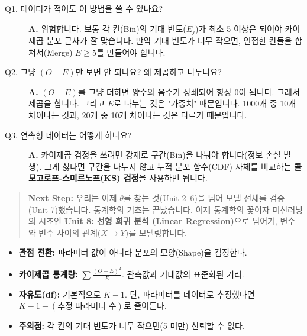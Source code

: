\documentclass[11pt,a4paper]{book}
\theoremstyle{definition}
\begin{document}
\begin{description}
    \item[Q1. 데이터가 적어도 이 방법을 쓸 수 있나요?]
    \textbf{A.} 위험합니다. 보통 각 칸(Bin)의 기대 빈도($E_j$)가 최소 5 이상은 되어야 카이제곱 분포 근사가 잘 맞습니다. 만약 기대 빈도가 너무 작으면, 인접한 칸들을 합쳐서(Merge) $E \ge 5$를 만들어야 합니다.
    
    \item[Q2. 그냥 $(O-E)$만 보면 안 되나요? 왜 제곱하고 나누나요?]
    \textbf{A.} $(O-E)$를 그냥 더하면 양수와 음수가 상쇄되어 항상 0이 됩니다. 그래서 제곱을 합니다. 그리고 $E$로 나누는 것은 "가중치" 때문입니다. 1000개 중 10개 차이나는 것과, 20개 중 10개 차이나는 것은 다르기 때문입니다.
    
    \item[Q3. 연속형 데이터는 어떻게 하나요?]
    \textbf{A.} 카이제곱 검정을 쓰려면 강제로 구간(Bin)을 나눠야 합니다(정보 손실 발생). 그게 싫다면 구간을 나누지 않고 누적 분포 함수(CDF) 자체를 비교하는 \textbf{콜모고로프-스미르노프(KS) 검정}을 사용하면 됩니다.
\end{description}

\vspace{1cm}
\begin{quote}
\textbf{Next Step:} 우리는 이제 $\theta$를 찾는 것(Unit 2~6)을 넘어 모델 전체를 검증(Unit 7)했습니다. 통계학의 기초는 끝났습니다. 이제 통계학의 꽃이자 머신러닝의 시초인 \textbf{Unit 8: 선형 회귀 분석 (Linear Regression)}으로 넘어가, 변수와 변수 사이의 관계($X \to Y$)를 모델링합니다.
\end{quote}

\begin{summarybox}[title={Unit 7 핵심 요약}]
\begin{itemize}
    \item \textbf{관점 전환:} 파라미터 값이 아니라 분포의 모양(Shape)을 검정한다.
    \item \textbf{카이제곱 통계량:} $\sum \frac{(O-E)^2}{E}$. 관측값과 기대값의 표준화된 거리.
    \item \textbf{자유도(df):} 기본적으로 $K-1$. 단, 파라미터를 데이터로 추정했다면 $K-1-(\text{추정 파라미터 수})$로 줄어든다.
    \item \textbf{주의점:} 각 칸의 기대 빈도가 너무 작으면(5 미만) 신뢰할 수 없다.
\end{itemize}
\end{summarybox}


\end{document}
